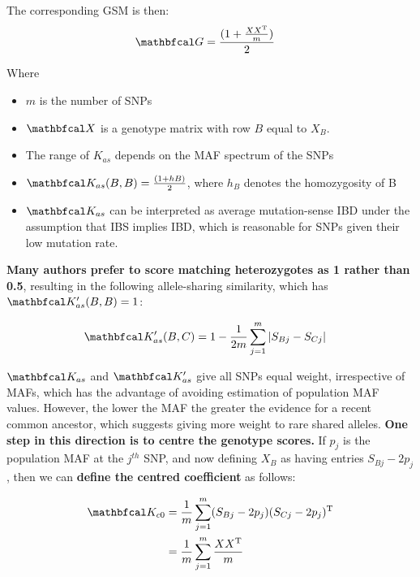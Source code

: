 \documentclass[document.tex]{subfiles}
\begin{document}
The corresponding GSM is then: 
\begin{equation}
    \begin{split}
        \mat{G} & = \frac{(1 + \frac{XX^\text{T}}{m})}{2}
    \end{split}
\end{equation}

Where 
\begin{itemize}
    \item $m$ is the number of SNPs
    \item $\mat{X}$ is a genotype matrix with row $B$ equal to $X_B$.
    \item The range of $K_{as}$ depends on the MAF spectrum of the SNPs
    \item $\mat{K}_{as}(B,B) = \frac{(1 + hB)}{2}$, where $h_B$ denotes the homozygosity of B
    \item $\mat{K}_{as}$ can be interpreted as average mutation-sense IBD under the assumption 
    that IBS implies IBD, which is reasonable for SNPs given their low mutation rate.
\end{itemize}


\textbf{Many authors prefer to score matching heterozygotes as 1 rather than 0.5}, 
resulting in the following allele-sharing similarity, which has $\mat{K}_{as}'(B,B) = 1$:

\begin{equation}
    \begin{split}
        \mat{K}_{as}'(B,C) & = 1 - \frac{1}{2m} \sum\limits_{j=1}^{m} |S_{Bj}-S_{Cj}|
    \end{split}
\end{equation}

$\mat{K}_{as}$ and $\mat{K}_{as}'$ give all SNPs equal weight, 
irrespective of MAFs, which has the advantage of avoiding estimation of 
population MAF values. However, the lower the MAF the greater the evidence 
for a recent common ancestor, which suggests giving more weight to 
rare shared alleles. 
\textbf{One step in this direction is to centre the genotype scores.} 
If $p_j$ is the population MAF at the $j^{th}$ SNP, 
and now defining $X_B$ as having entries $S_{Bj} - 2p_j$, then 
we can \textbf{define the centred coefficient} as follows:

\begin{equation}
    \begin{split}
        \mat{K}_{c0} & = \frac{1}{m} \sum\limits_{j=1}^{m} (S_{Bj}-2p_j)(S_{Cj}-2p_j)^\text{T} \\
                    & = \frac{1}{m} \sum\limits_{j=1}^{m} \frac{XX^\text{T}}{m}
    \end{split}
\end{equation}
\end{document}

